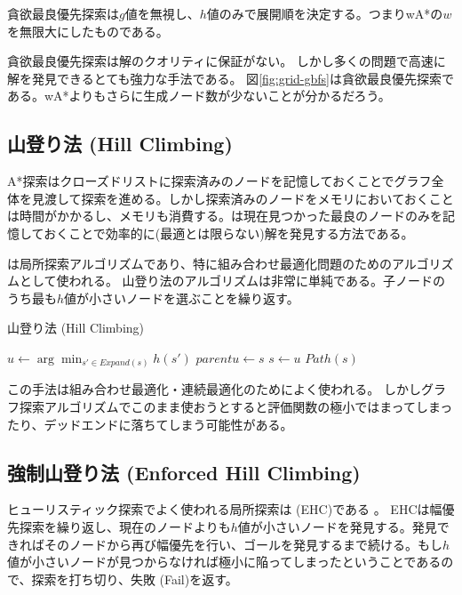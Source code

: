 貪欲最良優先探索は$g$値を無視し、$h$値のみで展開順を決定する。つまりwA*の$w$を無限大にしたものである。

貪欲最良優先探索は解のクオリティに保証がない。
しかし多くの問題で高速に解を発見できるとても強力な手法である。
図\ref{fig:grid-gbfs}は貪欲最良優先探索である。wA*よりもさらに生成ノード数が少ないことが分かるだろう。

\subsection{山登り法 (Hill Climbing)}
\label{sec:hill-climbing}

A*探索はクローズドリストに探索済みのノードを記憶しておくことでグラフ全体を見渡して探索を進める。しかし探索済みのノードをメモリにおいておくことは時間がかかるし、メモリも消費する。は現在見つかった最良のノードのみを記憶しておくことで効率的に(最適とは限らない)解を発見する方法である。

は局所探索アルゴリズムであり、特に組み合わせ最適化問題のためのアルゴリズムとして使われる。
山登り法のアルゴリズムは非常に単純である。子ノードのうち最も$h$値が小さいノードを選ぶことを繰り返す。

\begin{algorithm}
\caption{山登り法 (Hill Climbing)}
	 {
	  $u \leftarrow \arg \min_{s' \in Expand(s)} h(s')$\;
          $parent{u} \leftarrow s$\;
          $s \leftarrow u$\;
	}
	\Return $Path(s)$
\label{alg:hill-climbing}
\end{algorithm}

この手法は組み合わせ最適化・連続最適化のためによく使われる。
しかしグラフ探索アルゴリズムでこのまま使おうとすると評価関数の極小ではまってしまったり、デッドエンドに落ちてしまう可能性がある。


\subsection{強制山登り法 (Enforced Hill Climbing)}

ヒューリスティック探索でよく使われる局所探索は (EHC)である \cite{hoffmann2005ignoring}。
EHCは幅優先探索を繰り返し、現在のノードよりも$h$値が小さいノードを発見する。発見できればそのノードから再び幅優先を行い、ゴールを発見するまで続ける。もし$h$値が小さいノードが見つからなければ極小に陥ってしまったということであるので、探索を打ち切り、失敗 (Fail)を返す。

